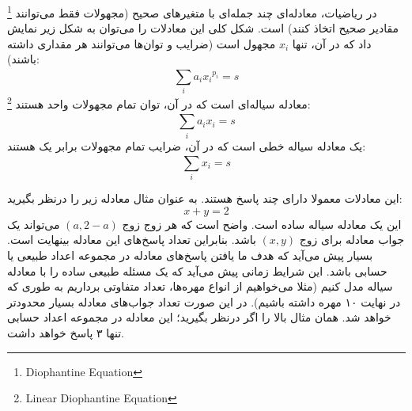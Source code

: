 
\begin{definition}
    \p
    \footnote{Diophantine Equation}
    در ریاضیات،
    معادله‌ای چند جمله‌ای با متغیرهای صحیح
    (مجهولات فقط می‌توانند مقادیر صحیح اتخاذ کنند)
    است. شکل کلی این معادلات را می‌توان به شکل زیر نمایش داد
    که در آن، تنها $x_i$ مجهول است
    (ضرایب و توان‌ها می‌توانند هر مقداری داشته باشند): 
    $$\sum\limits_{i}^{} {a_i} {x_i}^{p_i} = s$$
    \p
    \footnote{Linear Diophantine Equation}
    معادله سیاله‌ای است که در آن، توان تمام مجهولات واحد هستند:
    $$\sum\limits_{i}^{} {a_i} {x_i} = s$$
    \p
    یک معادله سیاله خطی است که در آن، ضرایب تمام مجهولات برابر یک هستند:
    $$\sum\limits_{i}^{} {x_i} = s$$
\end{definition}

\p
این معادلات معمولا دارای چند پاسخ هستند.
به عنوان مثال معادله زیر را درنظر بگیرید:
$$x + y = 2$$
این یک معادله سیاله ساده است.
واضح است که هر زوج زوج
$(a, 2-a)$
می‌تواند یک جواب معادله برای زوج
$(x,y)$
باشد. بنابراین تعداد پاسخ‌های این معادله بینهایت است.
بسیار پیش می‌آید که هدف ما یافتن پاسخ‌های معادله در مجموعه اعداد طبیعی یا حسابی باشد.
این شرایط زمانی پیش می‌آید که یک مسئله طبیعی ساده را با معادله سیاله مدل کنیم
(مثلا می‌خواهیم از انواع مهره‌ها، تعداد متفاوتی برداریم به طوری که در نهایت ۱۰ مهره داشته باشیم).
در این صورت تعداد جواب‌های معادله بسیار محدود‌تر خواهد شد.
همان مثال بالا را اگر درنظر بگیرید؛ این معادله در مجموعه اعداد حسابی تنها ۳ پاسخ خواهد داشت.




